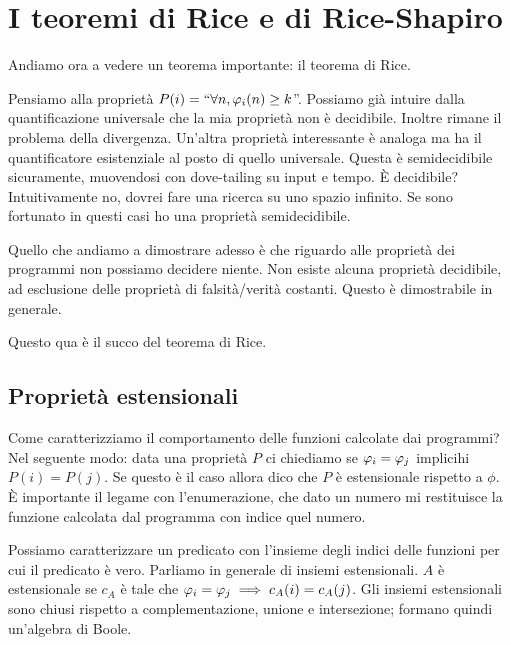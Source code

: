 %
%
%
%
\chapter{I teoremi di Rice e di Rice-Shapiro}

Andiamo ora a vedere un teorema importante: il teorema di Rice.

Pensiamo alla proprietà $P(i) = ``\forall n, \varphi_{i}(n) \geq k$''. Possiamo già intuire dalla
quantificazione universale che la mia proprietà non è decidibile. Inoltre rimane il problema della
divergenza. Un'altra proprietà interessante è analoga ma ha il quantificatore esistenziale al
posto di quello universale. Questa è semidecidibile sicuramente, muovendosi con dove-tailing su input
e tempo. È decidibile? Intuitivamente no, dovrei fare una ricerca su uno spazio infinito. Se sono
fortunato in questi casi ho una proprietà semidecidibile.

Quello che andiamo a dimostrare adesso è che riguardo alle proprietà dei programmi non possiamo
decidere niente. Non esiste alcuna proprietà decidibile, ad esclusione delle proprietà di
falsità/verità costanti. Questo è dimostrabile in generale.

Questo qua è il succo del teorema di Rice.

\section{Proprietà estensionali}

Come caratterizziamo il comportamento delle funzioni calcolate dai programmi? Nel seguente modo:
data una proprietà $P$ ci chiediamo se $\varphi_{i} = \varphi_{j}$ implicihi $P(i) = P(j)$. Se questo è il
caso allora dico che $P$ è estensionale rispetto a $\phi$. È importante il legame con l'enumerazione,
che dato un numero mi restituisce la funzione calcolata dal programma con indice quel numero.

Possiamo caratterizzare un predicato con l'insieme degli indici delle funzioni per cui il predicato
è vero. Parliamo in generale di insiemi estensionali. $A$ è estensionale se $c_{A}$ è tale
che $\varphi_{i} = \varphi_{j} \implies c_{A}(i) = c_{A}(j)$. Gli insiemi estensionali sono chiusi rispetto a
complementazione, unione e intersezione; formano quindi un'algebra di Boole.

